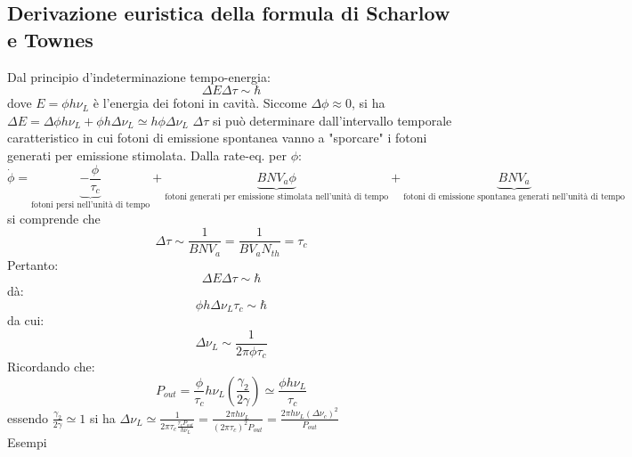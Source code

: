 \documentclass{book}
\def \D {\Delta}
\theoremstyle{remark}
\begin{document}
\subsection{Derivazione euristica della formula di Scharlow e Townes}
Dal principio d'indeterminazione tempo-energia:
\begin{equation*}
\D E \Delta \tau \sim \hbar
\end{equation*}
dove $E = \phi h \nu_L$ è l'energia dei fotoni in cavità. Siccome $\D \phi \approx 0$, si ha $\D E = \D \phi h \nu_L + \phi h \D\nu_L \simeq h\phi\D \nu_L$
$\D \tau$ si può determinare dall'intervallo temporale caratteristico in cui fotoni di emissione spontanea vanno a "sporcare" i fotoni generati per emissione stimolata.
Dalla rate-eq. per $\phi$:
\begin{equation*}
\dot{\phi} = \underbrace{-\frac{\phi}{\tau_c}}_\text{fotoni persi nell'unità di tempo} + \underbrace{BNV_a\phi}_\text{fotoni generati per emissione stimolata nell'unità di tempo} + \underbrace{BNV_a}_\text{fotoni di emissione spontanea generati nell'unità di tempo}
\end{equation*}
si comprende che
\begin{equation*}
\D\tau \sim \frac{1}{BNV_a} = \frac{1}{BV_aN_{th}} = \tau_c
\end{equation*}
Pertanto:
\begin{equation*}
\D E \D \tau \sim \hbar
\end{equation*}
dà:
\begin{equation*}
\phi h \D\nu_L \tau_c \sim \hbar
\end{equation*}
da cui:
\begin{equation*}
\D\nu_L \sim \frac{1}{2\pi \phi \tau_c}
\end{equation*}
Ricordando che:
\begin{equation*}
P_{out} = \frac{\phi}{\tau_c} h\nu_L \left(\frac{\gamma_2}{2\gamma}\right) \simeq \frac{\phi h \nu_L}{\tau_c}
\end{equation*}
essendo $\frac{\gamma_2}{2\gamma} \simeq 1$ si ha $\D\nu_L \simeq \frac{1}{2\pi \tau_c \frac{\tau_c P_{out}}{h\nu_L}} = \frac{2\pi h\nu_L}{(2\pi\tau_c)^2 P_{out}} = \frac{2\pi h\nu_L (\D \nu_c)^2}{P_{out}}$
\\
Esempi
\end{document}
